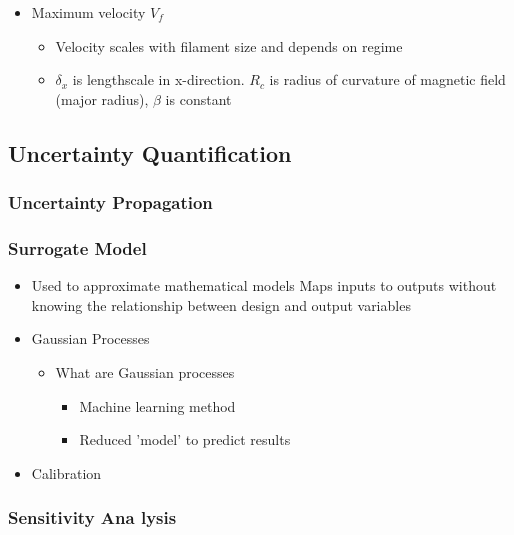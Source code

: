 \documentclass{article}
\begin{document}
\begin{itemize}
\begin{itemize}
        \item Maximum velocity $V_f$
        \begin{itemize}
            \item Velocity scales with filament size and depends on regime
            \item $\delta_x$ is lengthscale in x-direction. $R_c$ is radius of curvature of magnetic field (major radius), $\beta$ is constant
        \end{itemize}
    \end{itemize}
\end{itemize}

\subsection*{Uncertainty Quantification}
    \subsubsection*{Uncertainty Propagation}
    \subsubsection*{Surrogate Model}
    \begin{itemize}
        \item Used to approximate mathematical models
        \items Maps inputs to outputs without knowing the relationship between design and output variables
        \item Gaussian Processes
        \begin{itemize}
            \item What are Gaussian processes \cite{hornsby_gaussian_2024}
            \begin{itemize}    
                \item Machine learning method
                \item Reduced 'model' to predict results
            \end{itemize}
        \end{itemize}
        \item Calibration
    \end{itemize}
    \subsubsection*{Sensitivity Ana lysis}     

\nocite{*}
\printbibliography[title={References}]
\end{document}
